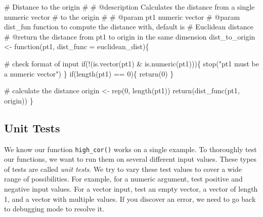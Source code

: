 \documentclass[
  letterpaper,
]{latex/krantz}
\makeatletter
\newenvironment{Shaded}{\begin{snugshade}}{\end{snugshade}}
\newcommand{\AttributeTok}[1]{\textcolor[rgb]{0.40,0.45,0.13}{#1}}
\newcommand{\CommentTok}[1]{\textcolor[rgb]{0.37,0.37,0.37}{#1}}
\newcommand{\ControlFlowTok}[1]{\textcolor[rgb]{0.00,0.23,0.31}{#1}}
\newcommand{\DecValTok}[1]{\textcolor[rgb]{0.68,0.00,0.00}{#1}}
\newcommand{\FunctionTok}[1]{\textcolor[rgb]{0.28,0.35,0.67}{#1}}
\newcommand{\NormalTok}[1]{\textcolor[rgb]{0.00,0.23,0.31}{#1}}
\newcommand{\OtherTok}[1]{\textcolor[rgb]{0.00,0.23,0.31}{#1}}
\newcommand{\SpecialCharTok}[1]{\textcolor[rgb]{0.37,0.37,0.37}{#1}}
\newcommand{\StringTok}[1]{\textcolor[rgb]{0.13,0.47,0.30}{#1}}
\newenvironment{kframe}{%
\medskip{}
\setlength{\fboxsep}{.8em}
 \def\at@end@of@kframe{}%
 \ifinner\ifhmode%
  \def\at@end@of@kframe{\end{minipage}}%
  \begin{minipage}{\columnwidth}%
 \fi\fi%
 \def\FrameCommand##1{\hskip\@totalleftmargin \hskip-\fboxsep
 \colorbox{shadecolor}{##1}\hskip-\fboxsep
     \hskip-\linewidth \hskip-\@totalleftmargin \hskip\columnwidth}%
 \MakeFramed {\advance\hsize-\width
   \@totalleftmargin\z@ \linewidth\hsize
   \@setminipage}}%
 {\par\unskip\endMakeFramed%
 \at@end@of@kframe}
\renewenvironment{Shaded}{\begin{kframe}}{\end{kframe}}
\makeatother
\begin{document}
\begin{Shaded}
\begin{Highlighting}[]
\CommentTok{\#\textquotesingle{} Distance to the origin}
\CommentTok{\#\textquotesingle{} }
\CommentTok{\#\textquotesingle{} @description Calculates the distance from a single numeric vector }
\CommentTok{\#\textquotesingle{} to the origin}
\CommentTok{\#\textquotesingle{}}
\CommentTok{\#\textquotesingle{} @param pt1 numeric vector }
\CommentTok{\#\textquotesingle{} @param dist\_fun function to compute the distance with, default is}
\CommentTok{\#\textquotesingle{} Euclidean distance}
\CommentTok{\#\textquotesingle{} @return the distance from pt1 to origin in the same dimension}
\NormalTok{dist\_to\_origin }\OtherTok{\textless{}{-}} \ControlFlowTok{function}\NormalTok{(pt1, }\AttributeTok{dist\_func =}\NormalTok{ euclidean\_dist)\{}
  
  \CommentTok{\# check format of input}
  \ControlFlowTok{if}\NormalTok{(}\SpecialCharTok{!}\NormalTok{(}\FunctionTok{is.vector}\NormalTok{(pt1) }\SpecialCharTok{\&} \FunctionTok{is.numeric}\NormalTok{(pt1)))\{}
    \FunctionTok{stop}\NormalTok{(}\StringTok{"pt1 must be a numeric vector"}\NormalTok{)}
\NormalTok{  \}}
  \ControlFlowTok{if}\NormalTok{(}\FunctionTok{length}\NormalTok{(pt1) }\SpecialCharTok{==} \DecValTok{0}\NormalTok{)\{}
    \FunctionTok{return}\NormalTok{(}\DecValTok{0}\NormalTok{)}
\NormalTok{  \}}
  
  \CommentTok{\# calculate the distance}
\NormalTok{  origin }\OtherTok{\textless{}{-}} \FunctionTok{rep}\NormalTok{(}\DecValTok{0}\NormalTok{, }\FunctionTok{length}\NormalTok{(pt1))}
  \FunctionTok{return}\NormalTok{(}\FunctionTok{dist\_func}\NormalTok{(pt1, origin))}
\NormalTok{\}}
\end{Highlighting}
\end{Shaded}

\subsection{\texorpdfstring{Unit Tests
}{Unit Tests }}\label{unit-tests}

We know our function \texttt{high\_cor()} works on a single example. To
thoroughly test our functions, we want to run them on several different
input values. These types of tests are called \emph{unit tests}. We try
to vary these test values to cover a wide range of possibilities. For
example, for a numeric argument, test positive and negative input
values. For a vector input, test an empty vector, a vector of length 1,
and a vector with multiple values. If you discover an error, we need to
go back to debugging mode to resolve it.
\end{document}
